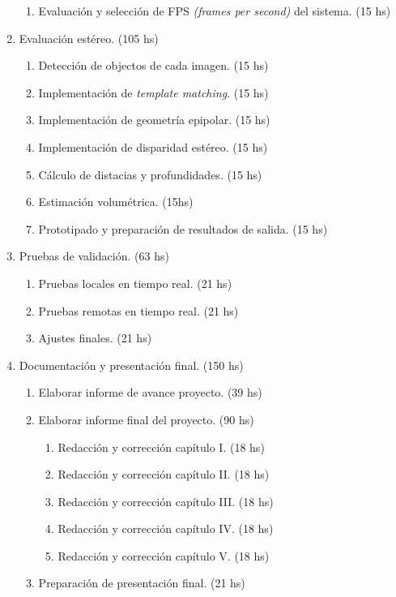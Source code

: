 \documentclass[
11pt, %
]{charter}
\begin{document}
\begin{enumerate}
\begin{enumerate}
		\item Evaluación y selección de FPS \emph{(frames per second)} del sistema. (15 hs)
	\end{enumerate}
\item Evaluación estéreo. (105 hs)
	\begin{enumerate}
 		\item Detección de objectos de cada imagen. (15 hs)
 		\item Implementación de \emph{template matching}. (15 hs)
 		\item Implementación de geometría epipolar. (15 hs)
 		\item Implementación de disparidad estéreo. (15 hs)
 		\item Cálculo de distacias y profundidades. (15 hs)
 		\item Estimación volumétrica. (15hs)
 		\item Prototipado y preparación de resultados de salida. (15 hs)
 	\end{enumerate}
\item Pruebas de validación. (63 hs)
	\begin{enumerate}
		\item Pruebas locales en tiempo real. (21 hs)
		\item Pruebas remotas en tiempo real. (21 hs)
		\item Ajustes finales. (21 hs)
	\end{enumerate}

\item Documentación y presentación final. (150 hs)
 	\begin{enumerate}
 		\item Elaborar informe de avance proyecto. (39 hs)
 		\item Elaborar informe final del proyecto. (90 hs)
 		\begin{enumerate}
			\item Redacción y corrección capítulo I. (18 hs)
			\item Redacción y corrección capítulo II. (18 hs)
			\item Redacción y corrección capítulo III. (18 hs)
			\item Redacción y corrección capítulo IV. (18 hs)
			\item Redacción y corrección capítulo V. (18 hs)
		\end{enumerate}
 		\item Preparación de presentación final. (21 hs)
 	\end{enumerate}
\end{enumerate}
\end{document}

